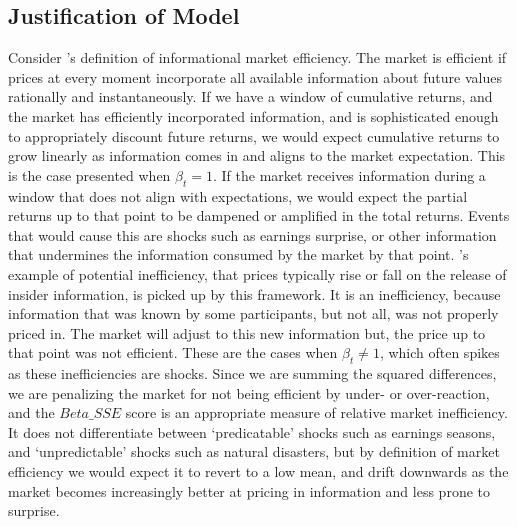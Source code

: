\subsection{Justification of Model}
Consider \citet{fama_EMH}'s definition of informational market efficiency. The market is efficient if prices at every moment incorporate all available information about future values rationally and instantaneously.
If we have a window of cumulative returns, and the market has efficiently incorporated information, and is sophisticated enough to appropriately discount future returns, we would expect cumulative returns to 
grow linearly as information comes in and aligns to the market expectation. This is the case presented when $\beta_t = 1$. 
If the market receives information during a window that does not align with expectations, we would expect the partial returns up to that point to be dampened or amplified in the total returns.
Events that would cause this are shocks such as earnings surprise, or other information that undermines the information
consumed by the market by that point. \citet{fama_EMH}'s example of potential inefficiency, that prices typically rise or fall on the release of insider information, is picked up by this framework.
It is an inefficiency, because information that was known by some participants, but not all, was not properly priced in. The market will adjust to this new information but, the price up to that point was not efficient. These are the cases when $\beta_t \neq 1$, which often spikes as these inefficiencies are shocks.
Since we are summing the squared differences, we are penalizing the market for not being efficient by under- or over-reaction, and the $Beta\_SSE$ score is an 
appropriate measure of relative market inefficiency. It does not differentiate between `predicatable' shocks such as earnings seasons, and `unpredictable' shocks such as natural disasters, but by definition of market 
efficiency we would expect it to revert to a low mean, and drift downwards as the market becomes increasingly better at pricing in information and less prone to surprise.